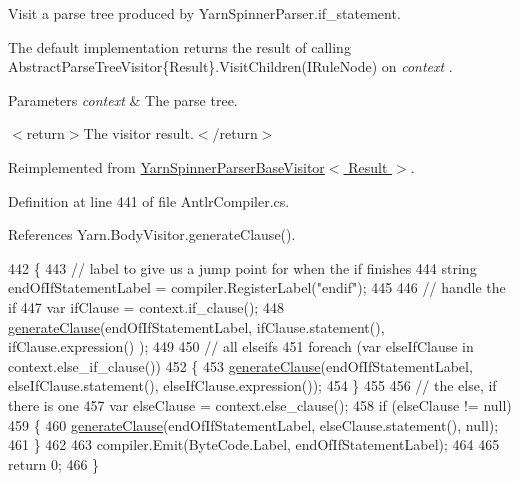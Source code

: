 Visit a parse tree produced by Yarn\-Spinner\-Parser.\-if\-\_\-statement. 

The default implementation returns the result of calling Abstract\-Parse\-Tree\-Visitor\{\-Result\}.\-Visit\-Children(\-I\-Rule\-Node) on {\itshape context} . 


\begin{DoxyParams}{Parameters}
{\em context} & The parse tree.\\
\hline
\end{DoxyParams}
$<$return$>$The visitor result.$<$/return$>$ 

Reimplemented from \hyperlink{a00187_a005f9655da52de2581762a4b61912ecd}{Yarn\-Spinner\-Parser\-Base\-Visitor$<$ Result $>$}.



Definition at line 441 of file Antlr\-Compiler.\-cs.



References Yarn.\-Body\-Visitor.\-generate\-Clause().


\begin{DoxyCode}
442         \{
443             \textcolor{comment}{// label to give us a jump point for when the if finishes}
444             \textcolor{keywordtype}{string} endOfIfStatementLabel = compiler.RegisterLabel(\textcolor{stringliteral}{"endif"});
445 
446             \textcolor{comment}{// handle the if}
447             var ifClause = context.if\_clause();
448             \hyperlink{a00034_a5f246aeaea2ba795d78abb0f8918cca4}{generateClause}(endOfIfStatementLabel, ifClause.statement(), ifClause.expression()
      );
449 
450             \textcolor{comment}{// all elseifs}
451             \textcolor{keywordflow}{foreach} (var elseIfClause \textcolor{keywordflow}{in} context.else\_if\_clause())
452             \{
453                 \hyperlink{a00034_a5f246aeaea2ba795d78abb0f8918cca4}{generateClause}(endOfIfStatementLabel, elseIfClause.statement(), 
      elseIfClause.expression());
454             \}
455 
456             \textcolor{comment}{// the else, if there is one}
457             var elseClause = context.else\_clause();
458             \textcolor{keywordflow}{if} (elseClause != null)
459             \{
460                 \hyperlink{a00034_a5f246aeaea2ba795d78abb0f8918cca4}{generateClause}(endOfIfStatementLabel, elseClause.statement(), null);
461             \}
462 
463             compiler.Emit(ByteCode.Label, endOfIfStatementLabel);
464 
465             \textcolor{keywordflow}{return} 0;
466         \}
\end{DoxyCode}


